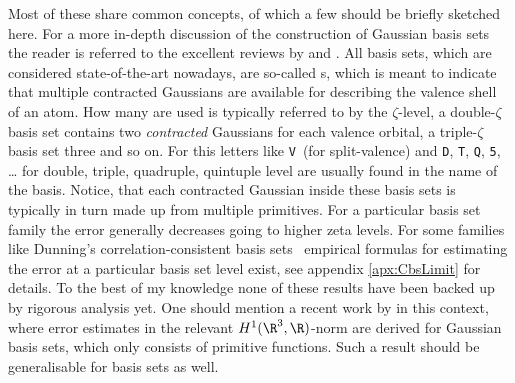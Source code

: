 Most of these share common concepts,
of which a few should be briefly sketched here.
For a more in-depth discussion of the construction of Gaussian basis sets
the reader is referred to the excellent reviews by \citet{Hill2013}
and \citet{Jensen2013}.
All basis sets, which are considered state-of-the-art nowadays,
are so-called s,
which is meant to indicate that multiple contracted Gaussians are available
for describing the valence shell of an atom.
How many are used is typically referred to by the $\zeta$-level,
\eg a double-$\zeta$ basis set contains two \emph{contracted} Gaussians
for each valence orbital,
a triple-$\zeta$ basis set three and so on.
For this letters like \texttt{V}~(for split-valence)
and \texttt{D}, \texttt{T}, \texttt{Q}, \texttt{5}, \ldots
for double, triple, quadruple, quintuple level are usually found
in the name of the basis.
Notice, that each contracted Gaussian inside these basis sets
is typically in turn made up from multiple primitives.
For a particular basis set family the error generally decreases
going to higher zeta levels.
For some families like Dunning's correlation-consistent
basis sets~\cite{Dunning1989,Jensen2005}
empirical formulas for estimating the error at a particular basis set
level exist, see appendix \vref{apx:CbsLimit} for details.
To the best of my knowledge none of these results have been
backed up by rigorous analysis yet.
One should mention a recent work by \citet{Bachmayr2014} in this context,
where error estimates
in the relevant $H^1(\R^3,\R)$-norm
are derived
for Gaussian basis sets,
which only consists of primitive \GTO functions.
Such a result should be generalisable for {\cGTO} basis sets as well.

